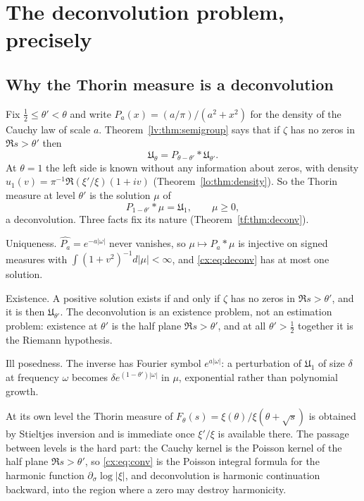 \section{The deconvolution problem, precisely}\label{cx:sec:problem}

\subsection{Why the Thorin measure is a deconvolution}

Fix $\tfrac12\le\theta'<\theta$ and write $P_a(x)=(a/\pi)/(a^2+x^2)$ for the density of the Cauchy law of scale $a$. Theorem~\ref{lv:thm:semigroup} says that if $\zeta$ has no zeros in $\Re s>\theta'$ then
\begin{equation}\label{cx:eq:conv}
\mathfrak U_\theta=P_{\theta-\theta'}*\mathfrak U_{\theta'} .
\end{equation}
At $\theta=1$ the left side is known without any information about zeros, with density $u_1(v)=\pi^{-1}\Re(\xi'/\xi)(1+iv)$ (Theorem~\ref{lo:thm:density}). So the Thorin measure at level $\theta'$ is the solution $\mu$ of
\begin{equation}\label{cx:eq:deconv}
P_{1-\theta'}*\mu=\mathfrak U_1,\qquad\mu\ge0,
\end{equation}
a deconvolution. Three facts fix its nature (Theorem~\ref{tf:thm:deconv}).

Uniqueness. $\widehat{P_a}=e^{-a|\omega|}$ never vanishes, so $\mu\mapsto P_a*\mu$ is injective on signed measures with $\int(1+v^2)^{-1}d|\mu|<\infty$, and \eqref{cx:eq:deconv} has at most one solution.

Existence. A positive solution exists if and only if $\zeta$ has no zeros in $\Re s>\theta'$, and it is then $\mathfrak U_{\theta'}$. The deconvolution is an existence problem, not an estimation problem: existence at $\theta'$ is the half plane $\Re s>\theta'$, and at all $\theta'>\tfrac12$ together it is the Riemann hypothesis.

Ill posedness. The inverse has Fourier symbol $e^{a|\omega|}$: a perturbation of $\mathfrak U_1$ of size $\delta$ at frequency $\omega$ becomes $\delta e^{(1-\theta')|\omega|}$ in $\mu$, exponential rather than polynomial growth.

At its own level the Thorin measure of $F_\theta(s)=\xi(\theta)/\xi(\theta+\sqrt s)$ is obtained by Stieltjes inversion and is immediate once $\xi'/\xi$ is available there. The passage between levels is the hard part: the Cauchy kernel is the Poisson kernel of the half plane $\Re s>\theta'$, so \eqref{cx:eq:conv} is the Poisson integral formula for the harmonic function $\partial_\sigma\log|\xi|$, and deconvolution is harmonic continuation backward, into the region where a zero may destroy harmonicity.

